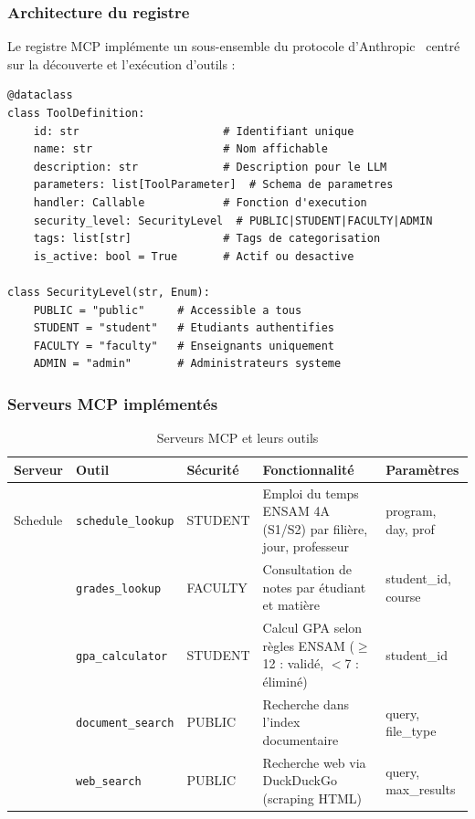 \documentclass[12pt, a4paper]{article}
\begin{document}
\subsubsection{Architecture du registre}

Le registre MCP implémente un sous-ensemble du protocole d'Anthropic~\cite{anthropic2024mcp} centré sur la découverte et l'exécution d'outils :

\begin{lstlisting}[caption={Définition d'un outil MCP}, label={lst:mcp_tool}]
@dataclass
class ToolDefinition:
    id: str                      # Identifiant unique
    name: str                    # Nom affichable
    description: str             # Description pour le LLM
    parameters: list[ToolParameter]  # Schema de parametres
    handler: Callable            # Fonction d'execution
    security_level: SecurityLevel  # PUBLIC|STUDENT|FACULTY|ADMIN
    tags: list[str]              # Tags de categorisation
    is_active: bool = True       # Actif ou desactive

class SecurityLevel(str, Enum):
    PUBLIC = "public"     # Accessible a tous
    STUDENT = "student"   # Etudiants authentifies
    FACULTY = "faculty"   # Enseignants uniquement
    ADMIN = "admin"       # Administrateurs systeme
\end{lstlisting}

\subsubsection{Serveurs MCP implémentés}

\begin{table}[H]
\centering
\caption{Serveurs MCP et leurs outils}
\label{tab:mcp_servers}
\small
\begin{tabularx}{\textwidth}{l l l X l}
\toprule
\textbf{Serveur} & \textbf{Outil} & \textbf{Sécurité} & \textbf{Fonctionnalité} & \textbf{Paramètres} \\
\midrule
\multirow{1}{*}{Schedule} & \texttt{schedule\_lookup} & STUDENT & Emploi du temps ENSAM 4A (S1/S2) par filière, jour, professeur & program, day, prof \\
\addlinespace
\multirow{2}{*}{Grades} & \texttt{grades\_lookup} & FACULTY & Consultation de notes par étudiant et matière & student\_id, course \\
 & \texttt{gpa\_calculator} & STUDENT & Calcul GPA selon règles ENSAM ($\geq$12 : validé, $<$7 : éliminé) & student\_id \\
\addlinespace
\multirow{2}{*}{Documents} & \texttt{document\_search} & PUBLIC & Recherche dans l'index documentaire & query, file\_type \\
 & \texttt{web\_search} & PUBLIC & Recherche web via DuckDuckGo (scraping HTML) & query, max\_results \\
\bottomrule
\end{tabularx}
\end{table}
\end{document}
